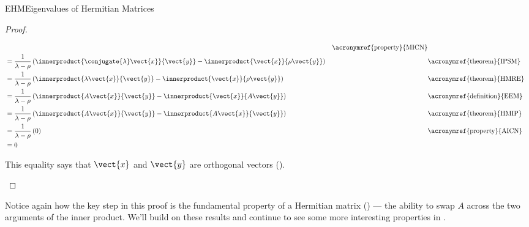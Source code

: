\begin{subsect}{EHM}{Eigenvalues of Hermitian Matrices}
\begin{proof}
\begin{para}
\begin{align*}
&&\text{\acronymref{property}{MICN}}\\
%
&=\frac{1}{\lambda-\rho}
\left(\innerproduct{\conjugate{\lambda}\vect{x}}{\vect{y}}-\innerproduct{\vect{x}}{\rho\vect{y}}\right)
&&\text{\acronymref{theorem}{IPSM}}\\
%
&=\frac{1}{\lambda-\rho}
\left(\innerproduct{\lambda\vect{x}}{\vect{y}}-\innerproduct{\vect{x}}{\rho\vect{y}}\right)
&&\text{\acronymref{theorem}{HMRE}}\\
%
&=\frac{1}{\lambda-\rho}
\left(\innerproduct{A\vect{x}}{\vect{y}}-\innerproduct{\vect{x}}{A\vect{y}}\right)
&&\text{\acronymref{definition}{EEM}}\\
%
&=\frac{1}{\lambda-\rho}
\left(\innerproduct{A\vect{x}}{\vect{y}}-\innerproduct{A\vect{x}}{\vect{y}}\right)
&&\text{\acronymref{theorem}{HMIP}}\\
%
&=\frac{1}{\lambda-\rho}\left(0\right)
&&\text{\acronymref{property}{AICN}}\\
&=0
%
\end{align*}
\end{para}
%
\begin{para}This equality says that $\vect{x}$ and $\vect{y}$ are orthogonal vectors ().\end{para}
%
\end{proof}
%
\begin{para}Notice again how the key step in this proof is the fundamental property of a Hermitian matrix () --- the ability to swap $A$ across the two arguments of the inner product.  We'll build on these results and continue to see some more interesting properties in .\end{para}
%
%
\end{subsect}
%
